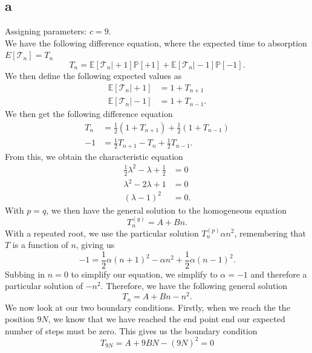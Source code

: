 \documentclass{article}
\newcommand{\Prob}{\mathbb{P}}
\newcommand{\E}{\mathbb{E}}
\begin{document}
\subsection{a}
Assigning parameters: $c=9$.\\
We have the following difference equation, where the expected time to absorption $E[\mathcal{T}_n]=T_n$
\begin{equation}
    T_n = \E[\mathcal{T}_n\vert +1]\Prob[+1] + \E[\mathcal{T}_n\vert -1]\Prob[-1].
\end{equation}
We then define the following expected values as
\begin{align}
    \E[\mathcal{T}_n\vert+1] &= 1+T_{n+1} \\
    \E[\mathcal{T}_n\vert-1] &= 1+T_{n-1} .
\end{align}
We then get the following difference equation
\begin{align}
    T_n &= \frac{1}{2}(1+T_{n+1}) + \frac{1}{2}(1+T_{n-1}) \\
    -1 &= \frac{1}{2}T_{n+1} -T_n + \frac{1}{2}T_{n-1}.
\end{align}
From this, we obtain the characteristic equation
\begin{align}
    \frac{1}{2}\lambda^2 -\lambda +\frac{1}{2} &= 0 \\
    \lambda^2 -2\lambda +1 &= 0\\
    (\lambda-1)^2 &= 0.
\end{align}
With $p=q$, we then have the general solution to the homogeneous equation 
\begin{equation}
    T_n^{(g)}=A+Bn.
\end{equation}
With a repeated root, we use the particular solution $T_n^{(p)}\alpha n^2$, remembering that $T$ is a function of $n$, giving us
\begin{equation}
    -1 = \frac{1}{2}\alpha(n+1)^2 - \alpha n^2 + \frac{1}{2}\alpha(n-1)^2. 
\end{equation}
Subbing in $n=0$ to simplify our equation, we simplify to $\alpha=-1$ and therefore a particular solution of $-n^2$. Therefore, we have the following general solution
\begin{equation}
    T_n = A+Bn-n^2.
\end{equation}
We now look at our two boundary conditions. Firstly, when we reach the the position $9N$, we know that we have reached the end point end our expected number of steps must be zero. This gives us the boundary condition
\begin{equation}
    T_{9N} = A + 9BN-(9N)^2=0
\end{equation}
\end{document}
